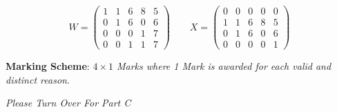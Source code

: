 \documentclass[a4paper,12pt]{article}
\begin{document}
\[
W = \begin{pmatrix}
1&1 & 6  &8 & 5
\\  0&1&6 &0 & 6
\\  0&0&0 &1 & 7
\\  0&0&1 &1 & 7
\end{pmatrix} \qquad X = \begin{pmatrix}
0&0&0 &0 & 0\\
1&1 & 6  &8 & 5
\\  0&1&6 &0 & 6
\\  0&0&0 &0 & 1

\end{pmatrix}
\]

\smallskip
\noindent \textbf{Marking Scheme}: \textit{$4 \times 1$ Marks where 1 Mark is awarded for each valid and distinct reason}.\\
\medskip

\noindent 	\textit{Please Turn Over For Part C }

\end{document}
